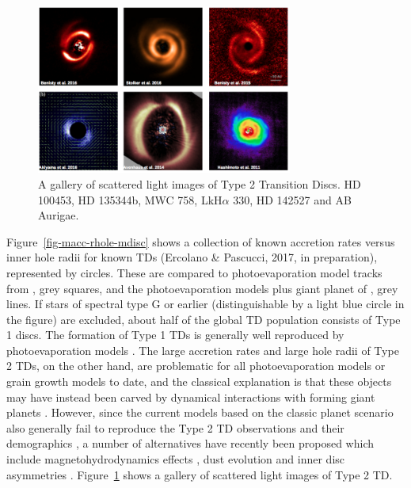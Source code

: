 \documentclass[10pt,fleqn,twoside]{article}
\begin{document}
\begin{figure}
\centerline{\includegraphics[width=0.75\textwidth]{figures/Type2TD_Scat.png}}
\caption{\label{fig-type2-scat}
  A gallery of scattered light images of Type 2 Transition Discs. 
 HD 100453, HD 135344b,
MWC 758, LkH$\alpha$ 330, HD 142527 and AB Aurigae.
} 
\end{figure}

Figure~\ref{fig-macc-rhole-mdisc} shows a collection of known accretion rates versus inner hole
radii for known TDs (Ercolano \& Pascucci, 2017, in preparation),
represented by circles. These are compared to photoevaporation model tracks from
\citet{2011MNRAS.412...13O}, grey squares, and the photoevaporation models plus giant planet
of \citet{2013MNRAS.430.1392R, 2015MNRAS.454.2173R}, grey lines. 
If stars of spectral type G or earlier (distinguishable by a light
blue circle in the figure) are excluded, about half of the global TD population consists of Type 1
discs. The formation of Type 1 TDs is generally well reproduced by
photoevaporation models \citep[e.g.,][]{2010MNRAS.401.1415O, 2011MNRAS.412...13O}.
The large accretion rates and large hole
radii of Type 2 TDs, on the other hand, are problematic for all 
photoevaporation models \citep[e.g.,][]{2013MNRAS.430.1392R, 2015MNRAS.454.2173R}
or grain
growth models \citep{2012A&A...544A..79B} to date, and the classical explanation is that
these objects may have instead been carved by dynamical interactions
with forming giant planets \citep[e.g.,][]{2011ApJ...729...47Z}. However, since the
current models based on the classic planet scenario also generally
fail to reproduce the Type 2 TD observations and 
their demographics \citep[see e.g.,][]{2016ApJ...825...77D},
a number of alternatives have recently been proposed which include magnetohydrodynamics
effects \citep[e.e.,][]{2016arXiv160907510W}, dust evolution 
\citep{2016A&A...585A..35P} and inner disc asymmetries \citep{2016ApJ...823L...8M}.
Figure~\ref{fig-type2-scat} shows a gallery of scattered light images of Type 2 TD.
\end{document}
